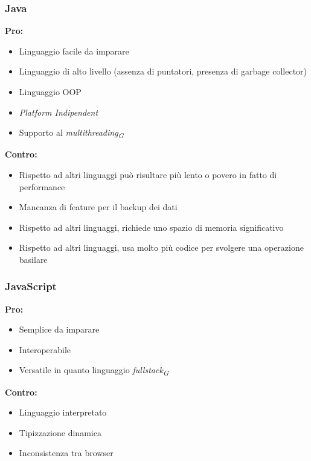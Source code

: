\documentclass[a4paper, 12pt]{article}
\begin{document}
\subsubsection{Java}
\textbf{Pro:}
\begin{itemize}
    \item Linguaggio facile da imparare
    \item Linguaggio di alto livello (assenza di puntatori, presenza di garbage collector)
    \item Linguaggio OOP
    \item \textit{Platform Indipendent}
    \item Supporto al \textit{multithreading\textsubscript{G}} 
\end{itemize}
\vspace*{0.5cm}
\textbf{Contro:}
\begin{itemize}
    \item Rispetto ad altri linguaggi può risultare più lento o povero in fatto di performance
    \item Mancanza di feature per il backup dei dati
    \item Rispetto ad altri linguaggi, richiede uno spazio di memoria significativo
    \item Rispetto ad altri linguaggi, usa molto più codice per svolgere una operazione basilare
\end{itemize}
\subsubsection{JavaScript}
\textbf{Pro:}
\begin{itemize}
    \item Semplice da imparare
    \item Interoperabile
    \item Versatile in quanto linguaggio \textit{fullstack\textsubscript{G}}
\end{itemize}
\vspace*{0.5cm}
\textbf{Contro:}
\begin{itemize}
    \item Linguaggio interpretato
    \item Tipizzazione dinamica
    \item Inconsistenza tra browser
\end{itemize}
\end{document}

